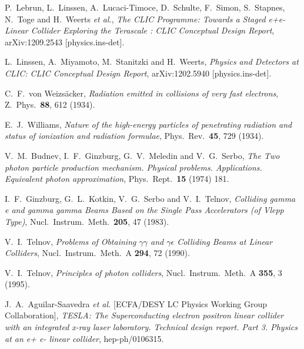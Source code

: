 \documentclass[12pt]{book}
\begin{document}
\begin{thebibliography}{19}
  P.~Lebrun, L.~Linssen, A.~Lucaci-Timoce, D.~Schulte, F.~Simon, S.~Stapnes, N.~Toge and H.~Weerts {\it et al.},
  {\em The CLIC Programme: Towards a Staged e+e- Linear Collider
    Exploring the Terascale : CLIC Conceptual Design Report},
  arXiv:1209.2543 [physics.ins-det].

  L.~Linssen, A.~Miyamoto, M.~Stanitzki and H.~Weerts,
  {\em Physics and Detectors at CLIC: CLIC Conceptual Design Report},
  arXiv:1202.5940 [physics.ins-det].

  C.~F.~von Weizs\"acker,
  {\em Radiation emitted in collisions of very fast electrons},
  Z.\ Phys.\  {\bf 88}, 612 (1934).

  E.~J.~Williams,
  {\em Nature of the high-energy particles of penetrating radiation
    and status of ionization and radiation formulae},
  Phys.\ Rev.\  {\bf 45}, 729 (1934).

  V.~M.~Budnev, I.~F.~Ginzburg, G.~V.~Meledin and V.~G.~Serbo,
  {\em The Two photon particle production mechanism. Physical problems.
  Applications. Equivalent photon approximation},
  Phys.\ Rept.\  {\bf 15} (1974) 181.

  I.~F.~Ginzburg, G.~L.~Kotkin, V.~G.~Serbo and V.~I.~Telnov,
  {\em Colliding gamma e and gamma gamma Beams Based on the Single
    Pass Accelerators (of Vlepp Type)},
  Nucl.\ Instrum.\ Meth.\  {\bf 205}, 47 (1983).

  V.~I.~Telnov,
  {\em Problems of Obtaining $\gamma \gamma$ and $\gamma \epsilon$
    Colliding Beams at Linear Colliders},
  Nucl.\ Instrum.\ Meth.\ A {\bf 294}, 72 (1990).

  V.~I.~Telnov,
  {\em Principles of photon colliders},
  Nucl.\ Instrum.\ Meth.\ A {\bf 355}, 3 (1995).

  J.~A.~Aguilar-Saavedra {\it et al.}  [ECFA/DESY LC Physics Working
  Group Collaboration],
  {\em TESLA: The Superconducting electron positron linear collider
    with an integrated x-ray laser laboratory. Technical design
    report. Part 3. Physics at an e+ e- linear collider},
  hep-ph/0106315.


\end{thebibliography}
\end{document}
